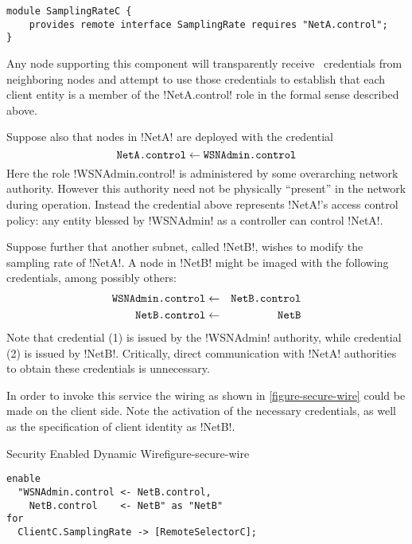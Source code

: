 \begin{lstlisting}
module SamplingRateC {
    provides remote interface SamplingRate requires "NetA.control";
}
\end{lstlisting}

\noindent Any node supporting this component will transparently receive \RT\ credentials from
neighboring nodes and attempt to use those credentials to establish that each client entity is a
member of the !NetA.control! role in the formal sense described above.

Suppose also that nodes in !NetA! are deployed with the credential
\begin{displaymath}
\texttt{NetA.control} \leftarrow \texttt{WSNAdmin.control}
\end{displaymath}
Here the role !WSNAdmin.control! is administered by some overarching network authority. However
this authority need not be physically ``present'' in the network during operation. Instead the
credential above represents !NetA!'s access control policy: any entity blessed by !WSNAdmin! as
a controller can control !NetA!.

Suppose further that another subnet, called !NetB!, wishes to modify the sampling rate of
!NetA!. A node in !NetB! might be imaged with the following credentials, among possibly others:
\begin{eqnarray}
\texttt{WSNAdmin.control} & \leftarrow & \texttt{NetB.control} \\
\texttt{NetB.control}     & \leftarrow & \texttt{NetB}
\end{eqnarray}
Note that credential (1) is issued by the !WSNAdmin! authority, while credential (2) is issued
by !NetB!. Critically, direct communication with !NetA! authorities to obtain these credentials
is unnecessary.

In order to invoke this service the wiring as shown in \autoref{figure-secure-wire} could be
made on the client side. Note the activation of the necessary credentials, as well as the
specification of client identity as !NetB!.

\begin{fpfig}[t]{Security Enabled Dynamic Wire}{figure-secure-wire}
{
\singlespace
\begin{lstlisting}
enable
  "WSNAdmin.control <- NetB.control, 
    NetB.control    <- NetB" as "NetB"
for 
  ClientC.SamplingRate -> [RemoteSelectorC];
\end{lstlisting}
\primaryspacing
}
\end{fpfig}

